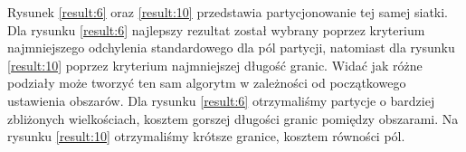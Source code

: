 Rysunek \ref{result:6} oraz \ref{result:10} przedstawia partycjonowanie tej samej siatki.
Dla rysunku \ref{result:6} najlepszy rezultat został wybrany poprzez kryterium najmniejszego odchylenia standardowego
dla pól partycji, natomiast dla rysunku \ref{result:10} poprzez kryterium najmniejszej długość granic.
Widać jak różne podziały może tworzyć ten sam algorytm w zależności od początkowego ustawienia obszarów.
Dla rysunku \ref{result:6} otrzymaliśmy partycje o bardziej zbliżonych wielkościach, kosztem gorszej długości granic pomiędzy obszarami.
Na rysunku \ref{result:10} otrzymaliśmy krótsze granice, kosztem równości pól.
\begin{figure}[h]
\centering
\begin{subfigure}{.33\textwidth}
    \centering
    \caption[short]{}
\end{subfigure}%
\begin{subfigure}{.33\textwidth}
    \centering

\end{subfigure}
\end{figure}
